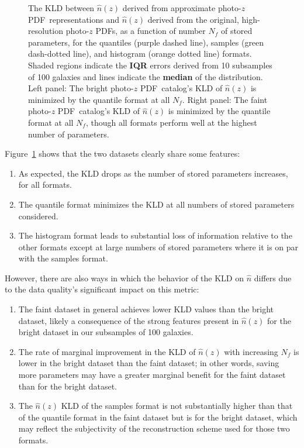 \documentclass[\docopts]{\docclass}
\newcommand{\pz}{photo-$z$ PDF}
\newcommand{\mgdata}{bright\xspace}
\newcommand{\ssdata}{faint\xspace}
\begin{document}
\begin{figure}
\begin{center}
    \caption{
    The KLD between $\hat{n}(z)$ derived from approximate \pz\ representations 
and $\hat{n}(z)$ derived from the original, high-resolution \pz s, as a 
function of number $N_{f}$ of stored parameters, for the quantiles (purple 
dashed line), samples (green dash-dotted line), and histogram (orange dotted 
line) formats.
    Shaded regions indicate the \textbf{IQR} errors derived from 10 subsamples 
of 100 galaxies and lines indicate the \textbf{median} of the distribution.
    Left panel: The \mgdata \pz\ catalog's KLD of $\hat{n}(z)$ is minimized by 
the quantile format at all $N_{f}$.
    Right panel: The \ssdata \pz\ catalog's KLD of $\hat{n}(z)$ is minimized by 
the quantile format at all $N_{f}$, though all formats perform well at the 
highest number of parameters.
    \label{fig:kld}}
  \end{center}
\end{figure}

Figure~\ref{fig:kld} shows that the two datasets clearly share some features:
\begin{enumerate}
\item As expected, the KLD drops as the number of stored parameters increases, 
for all formats.
\item The quantile format minimizes the KLD at all numbers of stored parameters 
considered.
\item The histogram format leads to substantial loss of information relative to 
the other formats except at large numbers of stored parameters where it is on 
par with the samples format.
\end{enumerate}

However, there are also ways in which the behavior of the KLD on $\hat{n}$ 
differs due to the data quality's significant impact on this metric:
\begin{enumerate}
\item The \ssdata dataset in general achieves lower KLD values than the \mgdata 
dataset, likely a consequence of the strong features present in $\hat{n}(z)$ 
for the \mgdata dataset in our subsamples of 100 galaxies.
\item The rate of marginal improvement in the KLD of $\hat{n}(z)$ with 
increasing $N_{f} $ is lower in the \mgdata dataset than the \ssdata dataset; 
in other words, saving more parameters may have a greater marginal benefit for 
the \ssdata dataset than for the \mgdata dataset.
\item The $\hat{n}(z)$ KLD of the samples format is not substantially higher 
than that of the quantile format in the \ssdata dataset but is for the \mgdata 
dataset, which may reflect the subjectivity of the reconstruction scheme used 
for those two formats.
\end{enumerate}
\end{document}
